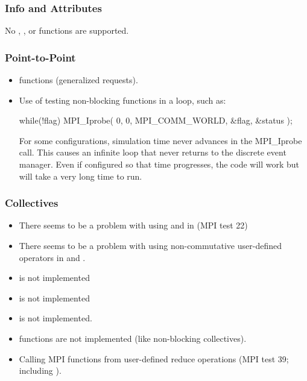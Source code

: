 \subsubsection{Info and Attributes}
\label{subsubsec:issues:mpi:info}

No , , or  functions are supported.

\subsubsection{Point-to-Point}
\label{subsubsec:issues:mpi:ptpt}

\begin{itemize}
\item {} functions (generalized requests).
\item Use of testing non-blocking functions in a loop, such as:


\begin{CppCode}
while(!flag)
{
  MPI_Iprobe( 0, 0, MPI_COMM_WORLD, &flag, &status );
}
\end{CppCode}

For some configurations, simulation time never advances in the MPI\_Iprobe call. 
This causes an infinite loop that never returns to the discrete event manager. 
Even if configured so that time progresses, the code will work but will take a very long time to run.
	
\end{itemize}


\subsubsection{Collectives}
\label{subsubsec:issues:mpi:collectives}

\begin{itemize}
\item There seems to be a problem with using  and  in  (MPI test 22)
\item There seems to be a problem with using non-commutative user-defined operators in  and .
\item {} is not implemented
\item {} is not implemented
\item {} is not implemented.
\item {} functions are not implemented  (like non-blocking collectives).
\item Calling MPI functions from user-defined reduce operations (MPI test 39; including ).
\end{itemize}

